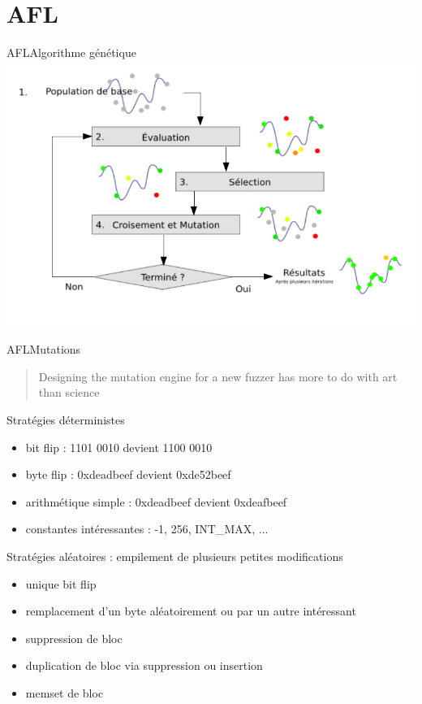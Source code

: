 \section{AFL}

\begin{frame}{AFL}{Algorithme génétique}
  \includegraphics[width=\textwidth]{../medias/schema_genetique.png}
\end{frame}

\begin{frame}{AFL}{Mutations}
  \begin{quote}\Large
  Designing the mutation engine for a new fuzzer has more to do with art than science
  \end{quote}
  \begin{exampleblock}{Stratégies déterministes}
    \begin{itemize}
      \item{bit flip : 1101 0010 devient 1100 0010} \pause
      \item{byte flip : 0xdeadbeef devient 0xde52beef} \pause
      \item{arithmétique simple : 0xdeadbeef devient 0xdeafbeef} \pause
      \item{constantes intéressantes : -1, 256, INT\_MAX, ...} \pause
    \end{itemize}
  \end{exampleblock}
  \begin{exampleblock}{Stratégies aléatoires : empilement de plusieurs petites modifications}
    \begin{itemize}
      \item{unique bit flip} \pause
      \item{remplacement d'un byte aléatoirement ou par un autre intéressant} \pause
      \item{suppression de bloc} \pause
      \item{duplication de bloc via suppression ou insertion} \pause
      \item{memset de bloc}
    \end{itemize}
  \end{exampleblock}
\end{frame}

